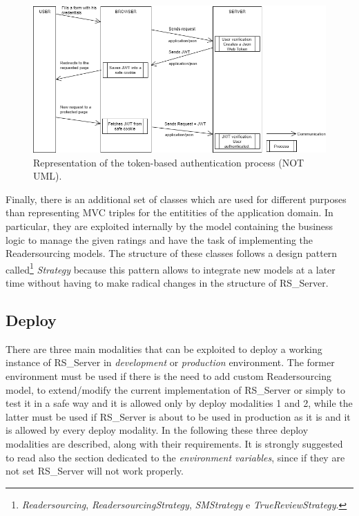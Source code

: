 \documentclass[a4paper, english]{article}
\begin{document}
\begin{figure}[!tbp]
\centering
\includegraphics[width=\textwidth]{figures/autenticazione.png}
\caption{Representation of the token-based authentication process (NOT UML).}
\label{fig:auth}
\end{figure}

Finally, there is an additional set of classes which are used for different purposes than representing MVC triples for the entitities of the application domain. In particular, they are exploited internally by the model containing the business logic to manage the given ratings and have the task of implementing the Readersourcing models. The structure of these classes follows a design pattern called\footnote{\emph{Readersourcing}, \emph{ReadersourcingStrategy}, \emph{SMStrategy} e \emph{TrueReviewStrategy}. } \emph{Strategy} because this pattern allows to integrate new models at a later time without having to make radical changes in the structure of RS\_Server.

\subsection{Deploy}

There are three main modalities that can be exploited to deploy a working instance of RS\_Server in \emph{development} or \emph{production} environment. The former environment must be used if there is the need to add custom Readersourcing model, to extend/modify the current implementation of RS\_Server or simply to test it in a safe way and it is allowed only by deploy modalities 1 and 2, while the latter must be used if RS\_Server is about to be used in production as it is and it is allowed by every deploy modality. In the following these three deploy modalities are described, along with their requirements. It is strongly suggested to read also the section dedicated to the \emph{environment variables}, since if they are not set RS\_Server will not work properly.
\end{document}
